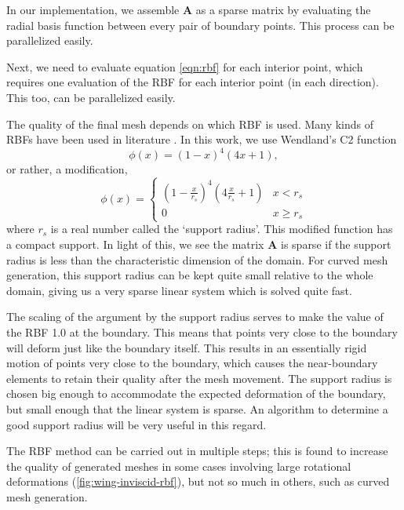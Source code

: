  In our implementation, we assemble $\mathbf{A}$ as a sparse matrix by evaluating the radial basis function between every pair of boundary points. This process can be parallelized easily.
 
 Next, we need to evaluate equation \eqref{eqn:rbf} for each interior point, which requires one evaluation of the RBF for each interior point (in each direction). This too, can be parallelized easily.
 
 The quality of the final mesh depends on which RBF is used. Many kinds of RBFs have been used in literature \cite{mm:rbf, mm:rbf2}. In this work, we use Wendland's C2 function
 \begin{equation}
 \phi(x) = (1-x)^4(4x + 1),
 \end{equation}
 or rather, a modification,
 \begin{equation}
 \phi(x) = 
 \begin{cases}
 \left(1-\frac{x}{r_s}\right)^4\left(4\frac{x}{r_s} + 1\right) & x < r_s \\
 0 & x \geq r_s
 \end{cases}
 \end{equation}
 where $r_s$ is a real number called the `support radius'. This modified function has a compact support. In light of this, we see the matrix $\mathbf{A}$ is sparse if the support radius is less than the characteristic dimension of the domain. For curved mesh generation, this support radius can be kept quite small relative to the whole domain, giving us a very sparse linear system which is solved quite fast.
 
 The scaling of the argument by the support radius serves to make the value of the RBF 1.0 at the boundary. This means that points very close to the boundary will deform just like the boundary itself. This results in an essentially rigid motion of points very close to the boundary, which causes the near-boundary elements to retain their quality after the mesh movement. The support radius is chosen big enough to accommodate the expected deformation of the boundary, but small enough that the linear system is sparse. An algorithm to determine a good support radius will be very useful in this regard.
 
 The RBF method can be carried out in multiple steps; this is found to increase the quality of generated meshes in some cases involving large rotational deformations (\ref{fig:wing-inviscid-rbf}), but not so much in others, such as curved mesh generation.
 
